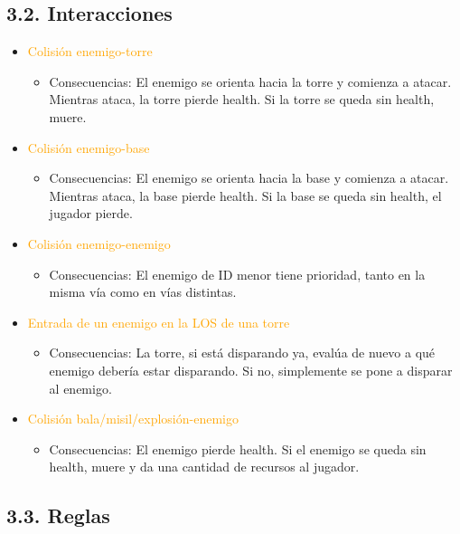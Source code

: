 \documentclass{article}
\begin{document}
\subsection{3.2. Interacciones}

\begin{itemize}
    \item \textcolor{Orange}{Colisión enemigo-torre}
    \begin{itemize}
        \item Consecuencias:  El enemigo se orienta hacia la torre y comienza a atacar. Mientras ataca, la torre pierde health. Si la torre se queda sin health, muere.
    \end{itemize}
    \item \textcolor{Orange}{Colisión enemigo-base}
    \begin{itemize}
        \item Consecuencias: El enemigo se orienta hacia la base y comienza a atacar. Mientras ataca, la base pierde health. Si la base se queda sin health, el jugador pierde.
    \end{itemize}
    \clearpage
    \item \textcolor{Orange}{Colisión enemigo-enemigo}
    \begin{itemize}
        \item Consecuencias: El enemigo de ID menor tiene prioridad, tanto en la misma vía como en vías distintas.
    \end{itemize}
    \item \textcolor{Orange}{Entrada de un enemigo en la LOS de una torre}
    \begin{itemize}
        \item Consecuencias: La torre, si está disparando ya, evalúa de nuevo a qué enemigo debería estar disparando. Si no, simplemente se pone a disparar al enemigo.
    \end{itemize}
    \item \textcolor{Orange}{Colisión bala/misil/explosión-enemigo}
    \begin{itemize}
        \item Consecuencias: El enemigo pierde health. Si el enemigo se queda sin health, muere y da una cantidad de recursos al jugador.
    \end{itemize}
\end{itemize}

\subsection{3.3. Reglas}
\end{document}
